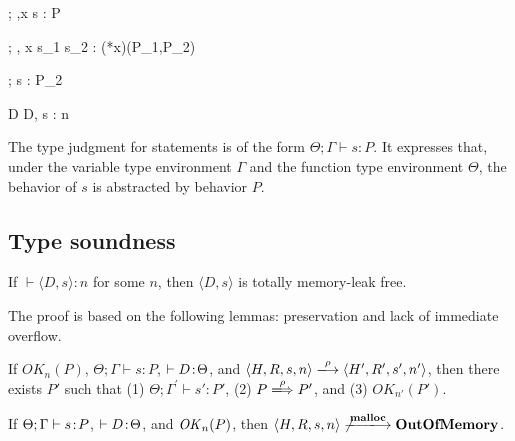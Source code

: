 \begin{minipage}{\textwidth}

{\Theta ; \Gamma,x \vdash \scon\Sirx s : \scon\Sirx P}


{\Theta ; \Gamma, x \vdash \IFNULL\Sirx \; \THEN s_{1}\; \ELSE s_{2} : (*x)(P_1,P_2)}


{\Theta ; \Gamma \vdash s : P_{2}}

        {\vdash D \COL \Theta}
{\vdash \langle D, s \rangle : n}

\end{minipage}

The type judgment for statements is of the form $\Theta ; \Gamma
\vdash s : P$.  It expresses that, under the variable type environment
\(\Gamma\) and the function type environment \(\Theta\), the behavior
of $s$ is abstracted by behavior $P$.

\subsection{Type soundness}
\begin{theorem}\label{thm1}
If $\vdash \langle D, s \rangle : n$ for some \(n\), then \(\langle D,
s \rangle\) is totally memory-leak free.
\end{theorem}

The proof is based on the following lemmas: preservation and lack of
immediate overflow.

\begin{lemma}[Preservation]
\label{lem:preservation}
If $OK_{n}(P)$, $\Theta; \Gamma \vdash s : P$, \(\vdash D \!:\!
\Theta\), and $\langle H,R,s,n \rangle \xlongrightarrow{\rho} \langle
H',R',s', n' \rangle$, then there exists $P'$ such that (1) $ \Theta;
\Gamma^{'} \vdash s' : P'$, (2) \(P \xLongrightarrow{\rho} P'\), and (3)
\(OK_{n'}(P')\).
\end{lemma}

\begin{lemma}
\label{lem:immediateSafety}
If $\Theta; \Gamma \vdash s \!:\! P$, \(\vdash D \!:\! \Theta\), and
\(\mathit{OK}_n(P)\), then $\langle H, R, s, n \rangle
\not\xlongrightarrow{\Malloc} \OVERFLOW$.
\end{lemma}

